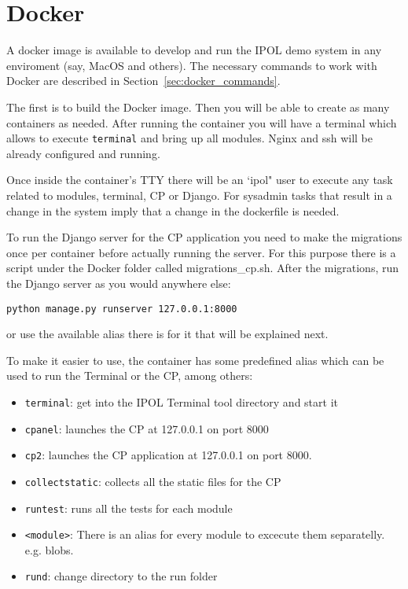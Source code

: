 \documentclass[a4paper,12pt]{article}
\begin{document}
\section{Docker}
A docker image is available to develop and run the IPOL demo system in any enviroment (say, MacOS and others).
The necessary commands to work with Docker are described in Section~\ref{sec:docker_commands}.

The first is to build the Docker image. Then you will be able to create as many containers as needed. After running the container you
will have a terminal which allows to execute {\tt terminal} and bring up all modules. Nginx and ssh will be already
configured and running.

Once inside the container's TTY there will be an `ipol" user to execute any task related to modules, terminal, 
CP or Django. For sysadmin tasks that result in a change in the system imply that a change in the dockerfile is needed.
 
To run the Django server for the CP application you need to make the migrations once per
container before actually running the server. For this purpose there is a script under the Docker folder called migrations\_cp.sh.
After the migrations, run the Django server as you would anywhere else:

{\tt python manage.py runserver 127.0.0.1:8000}

or use the available  alias there is for it that will be explained next.
 
To make it easier to use, the container has some predefined alias which can be used to run the Terminal or the CP, among others:
 \begin{itemize}
 	\item {\tt terminal}: get into the IPOL Terminal tool directory and start it
 	\item {\tt cpanel}: launches the CP at 127.0.0.1 on port 8000
 	\item {\tt cp2}: launches the CP application at 127.0.0.1 on port 8000.
 	\item {\tt collectstatic}: collects all the static files for the CP
 	\item {\tt runtest}: runs all the tests for each module
 	\item {\tt<module>}: There is an alias for every module to excecute them separatelly. e.g. blobs.
 	\item {\tt rund}: change directory to the run folder
 \end{itemize}
\end{document}
